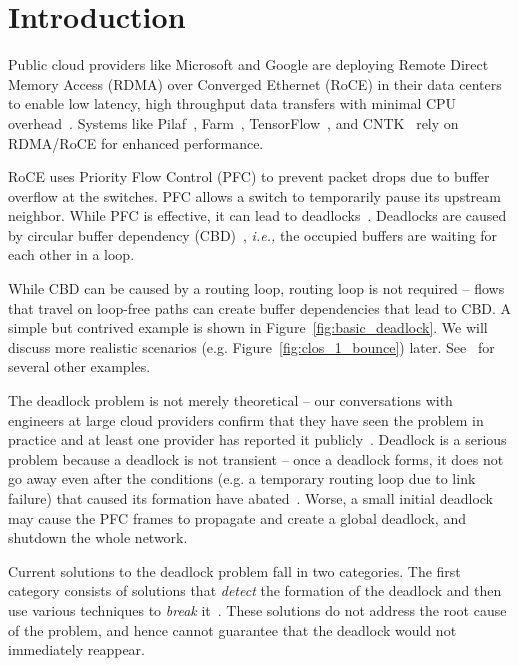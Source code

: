 \section{Introduction}
\label{sec:intro}

Public cloud providers like Microsoft and Google are deploying Remote Direct
Memory Access (RDMA) over Converged Ethernet (RoCE) in their data centers to enable low
latency, high throughput data transfers with minimal CPU
overhead~\cite{dcqcn,timely}. Systems like Pilaf~\cite{pilaf}, Farm~\cite{farm},
TensorFlow~\cite{tensorflow}, and CNTK~\cite{cntk} rely on RDMA/RoCE for
enhanced performance. 

RoCE uses Priority Flow Control (PFC) to prevent packet drops due to buffer
overflow at the switches. PFC allows a switch to temporarily pause its upstream
neighbor. While PFC is effective, it can lead to
deadlocks~\cite{rdmaatscale,tcpbolt,hu2016deadlocks}. Deadlocks are caused by
circular buffer dependency (CBD)~\cite{hu2016deadlocks}, {\em i.e.,} the occupied 
buffers are waiting for each other in a loop.

While CBD can be caused by a routing loop, routing loop is not required -- flows
that travel on loop-free paths can create buffer dependencies that lead to CBD.
A simple but contrived example is shown in Figure~\ref{fig:basic_deadlock}. We
will discuss more realistic scenarios (e.g. Figure~\ref{fig:clos_1_bounce})
later.  See~\cite{hu2016deadlocks} for several other examples. 

The deadlock problem is not merely theoretical -- our conversations with
engineers at large cloud providers confirm that they have seen the problem in
practice and at least one provider has reported it publicly~\cite{rdmaatscale}.
Deadlock is a serious problem because a deadlock is not transient -- once a
deadlock forms, it does not go away even after the conditions (e.g. a temporary
routing loop due to link failure) that caused its formation have
abated~\cite{rdmaatscale}. Worse, a small initial deadlock may cause the PFC
frames to propagate and create a global deadlock, and shutdown the whole
network.

Current solutions to the deadlock problem fall in two categories. The first
category consists of solutions that {\em detect} the formation of the deadlock
and then use various techniques to {\em break} it~\cite{shpiner2016unlocking}.
These solutions do not address the root cause of the problem, and hence cannot
guarantee that the deadlock would not immediately reappear.


